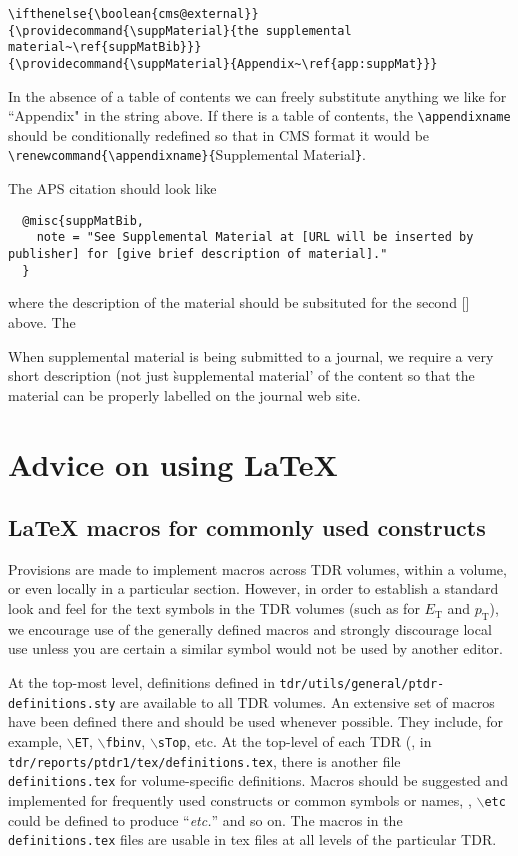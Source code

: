 \begin{verbatim}
\ifthenelse{\boolean{cms@external}}
{\providecommand{\suppMaterial}{the supplemental material~\ref{suppMatBib}}}
{\providecommand{\suppMaterial}{Appendix~\ref{app:suppMat}}}
\end{verbatim}
In the absence of a table of contents we can freely substitute anything we like for ``Appendix"  in the string above. If there is a table of contents, the \verb|\appendixname| should be conditionally redefined so that in CMS format it would be \verb|\renewcommand{\appendixname}{|Supplemental Material\verb|}|.

The APS citation should look like
\begin{verbatim}
  @misc{suppMatBib,
    note = "See Supplemental Material at [URL will be inserted by publisher] for [give brief description of material]."
  }
\end{verbatim}
where the description of the material should be subsituted for the second [] above. The 

When supplemental material is being submitted to a journal, we require a very short description (not just \`supplemental material' of the content so that the material can be properly labelled on the journal web site.
\clearpage
\section{Advice on using \texorpdfstring{\LaTeX}{LaTeX}\label{latex}}

\subsection{\texorpdfstring{\LaTeX}{LaTeX} macros for commonly used constructs}

Provisions are made to implement macros across TDR volumes, within a
volume, or even locally in a particular section. However, in order to
establish a standard look and feel for the text symbols in the TDR
volumes
(such  as for $E_\text{T}$ and $p_\text{T}$),
we encourage use of the generally
defined macros and strongly discourage local use unless you are
certain a similar symbol would not be used by another editor.

At the top-most level, definitions defined in
{\texttt{tdr/utils/general/ptdr-definitions.sty}} are
available to all TDR volumes. An extensive set of macros have been
defined there and should be used whenever possible. They include, for
example, $\backslash$\texttt{ET}, $\backslash$\texttt{fbinv},
$\backslash$\texttt{sTop}, etc.
At the top-level of each TDR
(\eg, in \texttt{tdr/reports/ptdr1/tex/definitions.tex}, there is another
file \texttt{definitions.tex} for volume-specific definitions. Macros
should be suggested and implemented for
frequently used constructs or common symbols or names, \eg,
{$\backslash$\texttt{etc}}
could be defined to produce ``\emph{etc.}'' and so on.
The macros in the \texttt{definitions.tex} files are usable
in tex files at all levels of the particular TDR.

